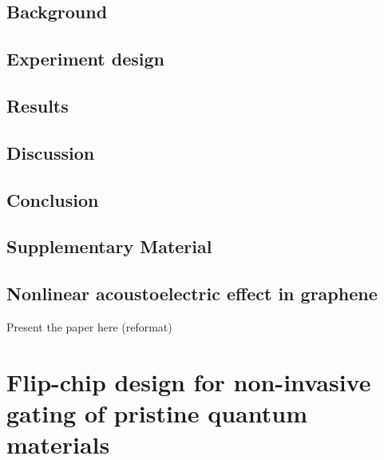 \documentclass[double,12pt,1in]{beavtex}
\begin{document}
\section{Background}

\section{Experiment design}

\section{Results}

\section{Discussion} \label{AE paper discussion}

\section{Conclusion}

\section{Supplementary Material}

\section{Nonlinear acoustoelectric effect in graphene} \label{nonlinear acoustoelectric effect}


Present the paper here (reformat)


\chapter{Flip-chip design for non-invasive gating of pristine quantum materials}
\end{document}

